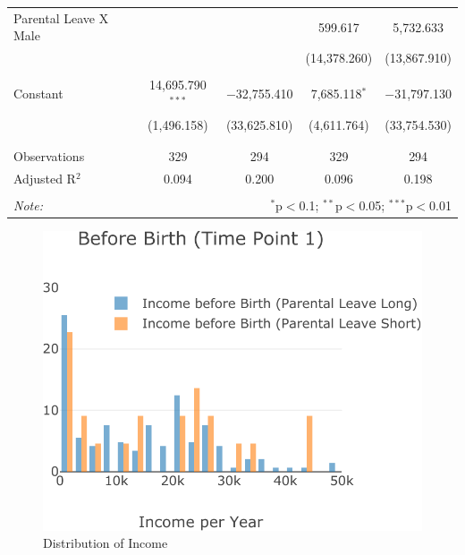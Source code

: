 \documentclass[
  12pt,
]{article}
\begin{document}
\begin{table}[!htbp]
\begin{tabular}{@{\extracolsep{-5pt}}lcccc}
 Parental Leave X Male &  &  & 599.617 & 5,732.633 \\ 
  &  &  & (14,378.260) & (13,867.910) \\ 
  & & & & \\ 
 Constant & 14,695.790$^{***}$ & $-$32,755.410 & 7,685.118$^{*}$ & $-$31,797.130 \\ 
  & (1,496.158) & (33,625.810) & (4,611.764) & (33,754.530) \\ 
  & & & & \\ 
\hline \\[-1.8ex] 
Observations & 329 & 294 & 329 & 294 \\ 
Adjusted R$^{2}$ & 0.094 & 0.200 & 0.096 & 0.198 \\ 
\hline 
\hline \\[-1.8ex] 
\textit{Note:}  & \multicolumn{4}{r}{$^{*}$p$<$0.1; $^{**}$p$<$0.05; $^{***}$p$<$0.01} \\ 
\end{tabular} 
\end{table}

\begin{figure}

{\centering \includegraphics{Parental_Leave-Finalizing-Data-Set_files/figure-latex/fig-3-1} 

}

\caption{Distribution of Income}\label{fig:fig-3}
\end{figure}
\end{document}
